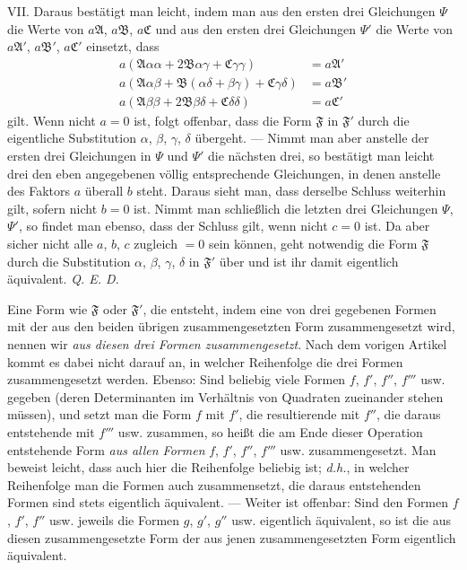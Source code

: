 VII. Daraus bestätigt man leicht, indem man aus den ersten drei Gleichungen $\Psi$ die Werte von $a\mathfrak{A}$, $a\mathfrak{B}$, $a\mathfrak{C}$ und aus den ersten drei Gleichungen $\Psi'$ die Werte von $a\mathfrak{A}'$, $a\mathfrak{B}'$, $a\mathfrak{C}'$ einsetzt, dass
\[
\begin{aligned}
a(\mathfrak{A}\alpha\alpha+2\mathfrak{B}\alpha\gamma+\mathfrak{C}\gamma\gamma)&=a\mathfrak{A}'\\
a(\mathfrak{A}\alpha\beta+\mathfrak{B}(\alpha\delta+\beta\gamma)+\mathfrak{C}\gamma\delta)&=a\mathfrak{B}'\\
a(\mathfrak{A}\beta\beta+2\mathfrak{B}\beta\delta+\mathfrak{C}\delta\delta)&=a\mathfrak{C}'
\end{aligned}
\]
gilt. Wenn nicht $a=0$ ist, folgt offenbar, dass die Form $\mathfrak{F}$ in $\mathfrak{F}'$ durch die eigentliche Substitution $\alpha$, $\beta$, $\gamma$, $\delta$ übergeht. --- Nimmt man aber anstelle der ersten drei Gleichungen in $\Psi$ und $\Psi'$ die nächsten drei, so bestätigt man leicht drei den eben angegebenen völlig entsprechende Gleichungen, in denen anstelle des Faktors $a$ überall $b$ steht. Daraus sieht man, dass derselbe Schluss weiterhin gilt, sofern nicht $b=0$ ist. Nimmt man schließlich die letzten drei Gleichungen $\Psi$, $\Psi'$, so findet man ebenso, dass der Schluss gilt, wenn nicht $c=0$ ist. Da aber sicher nicht alle $a$, $b$, $c$ zugleich $=0$ sein können, geht notwendig die Form $\mathfrak{F}$ durch die Substitution $\alpha$, $\beta$, $\gamma$, $\delta$ in $\mathfrak{F}'$ über und ist ihr damit eigentlich äquivalent. \textit{Q. E. D.}

Eine Form wie $\mathfrak{F}$ oder $\mathfrak{F}'$, die entsteht, indem eine von drei gegebenen Formen mit der aus den beiden übrigen zusammengesetzten Form zusammengesetzt wird, nennen wir \textit{aus diesen drei Formen zusammengesetzt}. Nach dem vorigen Artikel kommt es dabei nicht darauf an, in welcher Reihenfolge die drei Formen zusammengesetzt werden. Ebenso: Sind beliebig viele Formen $f$, $f'$, $f''$, $f'''$ usw. gegeben (deren Determinanten im Verhältnis von Quadraten zueinander stehen müssen), und setzt man die Form $f$ mit $f'$, die resultierende mit $f''$, die daraus entstehende mit $f'''$ usw. zusammen, so heißt die am Ende dieser Operation entstehende Form \textit{aus allen Formen} $f$, $f'$, $f''$, $f'''$ usw. zusammengesetzt. Man beweist leicht, dass auch hier die Reihenfolge beliebig ist; \textit{d.h.}, in welcher Reihenfolge man die Formen auch zusammensetzt, die daraus entstehenden Formen sind stets eigentlich äquivalent. --- Weiter ist offenbar: Sind den Formen $f$, $f'$, $f''$ usw. jeweils die Formen $g$, $g'$, $g''$ usw. eigentlich äquivalent, so ist die aus diesen zusammengesetzte Form der aus jenen zusammengesetzten Form eigentlich äquivalent.
